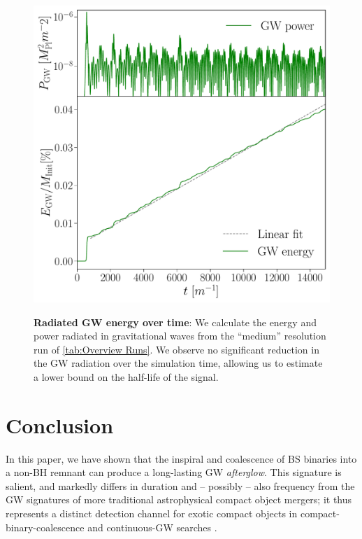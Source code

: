 \documentclass[aps,twocolumn,nofootinbib,superscriptaddress,amsfonts,floatfix
]{revtex4-1} %
\begin{document}
\begin{figure}[t]
\begin{center}
{\includegraphics[width=1.0\columnwidth]{Energy_Power.pdf}}
\caption{{\bf Radiated GW energy over time}: We calculate the energy and power radiated in gravitational waves from the ``medium'' resolution run of \cref{tab:Overview Runs}. 
We observe no significant reduction in the GW radiation over the simulation time, allowing us to estimate a lower bound on the half-life of the signal.
    }
\label{fig:EnergyPower}
\end{center}
\end{figure}

\section{Conclusion}\label{sec:conclusion}


In this paper, we have shown that the inspiral and
coalescence of BS binaries into a non-BH remnant can produce a long-lasting GW {\it afterglow}. This signature is salient, and markedly differs in duration and -- possibly -- also
frequency from the GW signatures of more traditional astrophysical compact object mergers; it thus represents a distinct detection channel for exotic compact objects
in compact-binary-coalescence and continuous-GW searches \cite{LIGOScientific:2019yhl,KAGRA:2021una,LIGOScientific:2021jlr,LIGOScientific:2021oez,LIGOScientific:2022lsr,LIGOScientific:2022pjk,LIGOScientific:2021hvc,LIGOScientific:2021ozr}.
\end{document}
